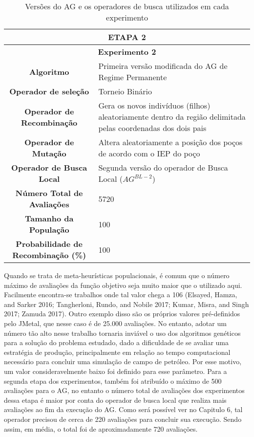  \begin{table}[H]
\centering
\caption{Versões do AG e os operadores de busca utilizados em cada experimento}

\begin{tabular}{|c|p{9cm}|}
 \hline
 \multicolumn{2}{|c|}{ETAPA 2} \\ \hline
 \multicolumn{2}{|c|}{\textbf{Experimento 2}} \\ \hline
 \textbf{Algoritmo} & Primeira versão modificada do AG de Regime Permanente \\ \hline
 \textbf{Operador de seleção} & Torneio Binário \\ \hline
 \textbf{Operador de Recombinação} & Gera os novos indivíduos (filhos) aleatoriamente dentro da região delimitada pelas coordenadas dos dois pais \\  \hline
 \textbf{Operador de Mutação} & Altera aleatoriamente a posição dos poços de acordo com o IEP do poço \\ \hline
 \textbf{Operador de Busca Local} & Segunda versão do operador de Busca Local ($AG^{BL-2}$) \\ \hline
 \textbf{Número Total de Avaliações} & 5720 \\ \hline
 \textbf{Tamanho da População} & 100 \\ \hline
 \textbf{Probabilidade de Recombinação (\%)} & 100 \\ \hline
 
 
 
\end{tabular}
\end{table}

Quando se trata de meta-heurísticas populacionais, é comum que o número máximo de avaliações da função objetivo seja muito maior que o utilizado aqui. Facilmente encontra-se trabalhos onde tal valor chega a 106 (Elsayed, Hamza, and Sarker 2016; Tangherloni, Rundo, and Nobile 2017; Kumar, Misra, and Singh 2017; Zamuda 2017). Outro exemplo disso são os próprios valores pré-definidos pelo JMetal, que nesse caso é de 25.000 avaliações. No entanto, adotar um número tão alto nesse trabalho tornaria inviável o uso dos algoritmos genéticos para a solução do problema estudado, dado a dificuldade de se avaliar uma estratégia de produção, principalmente em relação ao tempo computacional necessário para concluir uma simulação de campo de petróleo. Por esse motivo, um valor consideravelmente baixo foi definido para esse parâmetro. Para a segunda etapa dos experimentos, também foi atribuído o máximo de 500 avaliações para o AG, no entanto o número total de avaliações dos experimentos dessa etapa é maior por conta do operador de busca local que realiza mais avaliações ao fim da execução do AG. Como será possível ver no Capitulo 6, tal operador precisou de cerca de 220 avaliações para concluir sua execução. Sendo assim, em média, o total foi de aproximadamente 720 avaliações.

